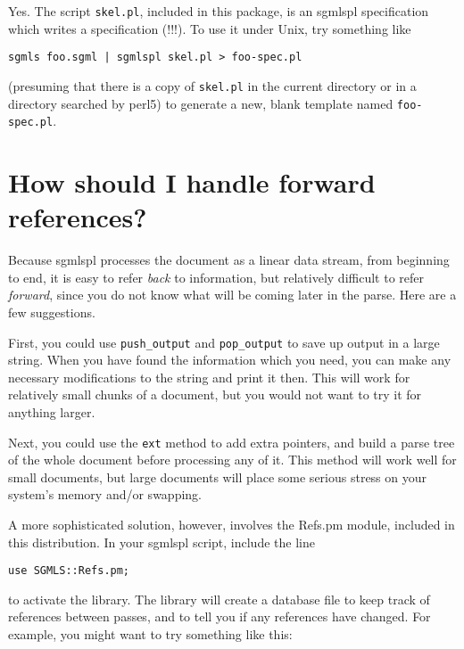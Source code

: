Yes.  The script {\tt skel.pl}, included in this
package, is an {\sc sgmlspl} specification which writes a specification
(!!!).  To use it under Unix, try something like

{\footnotesize\begin{verbatim}
sgmls foo.sgml | sgmlspl skel.pl > foo-spec.pl
\end{verbatim}}

(presuming that there is a copy of {\tt skel.pl}
in the current directory or in a directory searched by {\sc perl5}) to
generate a new, blank template named
{\tt foo-spec.pl}.




\section{How should I handle forward references?}
\label{FORWARD}


Because {\sc sgmlspl} processes the document as a linear data
stream, from beginning to end, it is easy to refer
{\em back\/} to information, but relatively difficult to
refer {\em forward\/}, since you do not know what will be
coming later in the parse.  Here are a few suggestions.

First, you could use {\tt push\_output} and
{\tt pop\_output} to
save up output in a large string.  When you have found the information
which you need, you can make any necessary modifications to the string
and print it then. This will work for relatively small chunks of a
document, but you would not want to try it for anything larger.

Next, you could use the {\tt ext} method to
add extra pointers, and build a parse tree of the whole document
before processing any of it.  This method will work well for small
documents, but large documents will place some serious stress on your
system's memory and/or swapping.

A more sophisticated solution, however, involves the
{\sc Refs.pm} module, included in this
distribution.  In your {\sc sgmlspl} script, include the line

{\footnotesize\begin{verbatim}
use SGMLS::Refs.pm;
\end{verbatim}}

to activate the library.  The library will create a database
file to keep track of references between passes, and to tell you if
any references have changed.  For example, you might want to try
something like this:

